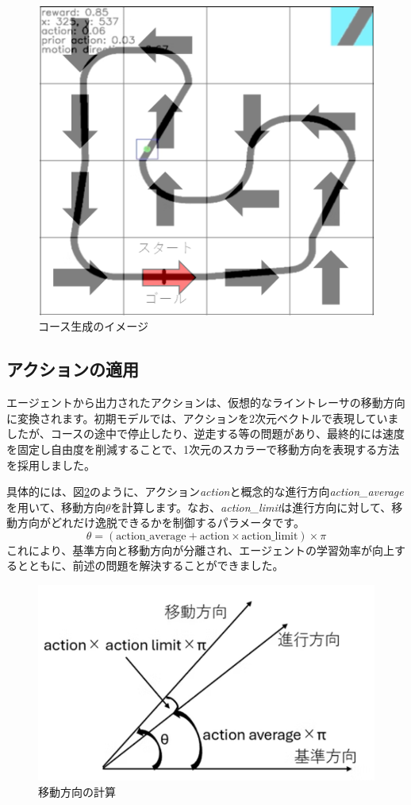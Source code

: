 \begin{figure}[h]
  \centering
  \includegraphics[width=0.7\hsize]{line-tracer/fig/image3.png}
  \caption{コース生成のイメージ}
  \label{fig:image3}
\end{figure}

\subsection{アクションの適用}
エージェントから出力されたアクションは、仮想的なライントレーサの移動方向に変換されます。初期モデルでは、アクションを2次元ベクトルで表現していましたが、コースの途中で停止したり、逆走する等の問題があり、最終的には速度を固定し自由度を削減することで、1次元のスカラーで移動方向を表現する方法を採用しました。

具体的には、図\ref{fig:image4}のように、アクション\textit{action}と概念的な進行方向\textit{action\_average}を用いて、移動方向$\theta$を計算します。なお、\textit{action\_limit}は進行方向に対して、移動方向がどれだけ逸脱できるかを制御するパラメータです。
\[
\theta = (\text{action\_average} + \text{action} \times \text{action\_limit}) \times \pi
\]
これにより、基準方向と移動方向が分離され、エージェントの学習効率が向上するとともに、前述の問題を解決することができました。
\begin{figure}[h]
  \centering
  \includegraphics[width=0.7\hsize]{line-tracer/fig/image4.png}
  \caption{移動方向の計算}
  \label{fig:image4}
\end{figure}


